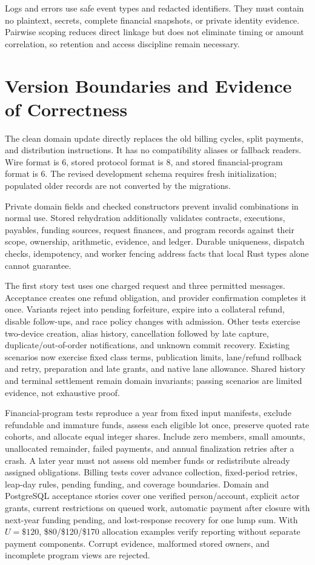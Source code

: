 \documentclass[11pt]{article}
\begin{document}
Logs and errors use safe event types and redacted identifiers. They must contain
no plaintext, secrets, complete financial snapshots, or private identity evidence.
Pairwise scoping reduces direct linkage but does not eliminate timing or amount
correlation, so retention and access discipline remain necessary.

\section{Version Boundaries and Evidence of Correctness}

The clean domain update directly replaces the old billing cycles, split payments,
and distribution instructions. It has no compatibility aliases or fallback
readers. Wire format is 6, stored protocol format is 8, and stored financial-program
format is 6. The revised development schema requires fresh initialization;
populated older records are not converted by the migrations.

Private domain fields and checked constructors prevent invalid combinations in
normal use. Stored rehydration additionally validates contracts, executions,
payables, funding sources, request finances, and program records against their
scope, ownership, arithmetic, evidence, and ledger. Durable uniqueness, dispatch
checks, idempotency, and worker fencing address facts that local Rust types alone
cannot guarantee.

The first story test uses one charged request and three permitted messages.
Acceptance creates one refund obligation, and provider confirmation completes it
once. Variants reject into pending forfeiture, expire into a collateral refund,
disable follow-ups, and race policy changes with admission. Other tests exercise
two-device creation, alias history, cancellation followed by late capture,
duplicate/out-of-order notifications, and unknown commit recovery.
Existing scenarios now exercise fixed class terms, publication limits, lane/refund
rollback and retry, preparation and late grants, and native lane allowance. Shared
history and terminal settlement remain domain invariants; passing scenarios are
limited evidence, not exhaustive proof.

Financial-program tests reproduce a year from fixed input manifests, exclude
refundable and immature funds, assess each eligible lot once, preserve quoted
rate cohorts, and allocate equal integer shares. Include zero members, small
amounts, unallocated remainder, failed payments, and
annual finalization retries after a crash. A later year must not assess old member funds
or redistribute already assigned obligations. Billing tests cover advance
collection, fixed-period retries, leap-day rules, pending funding, and coverage
boundaries. Domain and PostgreSQL acceptance stories cover one verified
person/account, explicit actor grants, current restrictions on queued work,
automatic payment after closure with next-year funding pending, and lost-response
recovery for one lump sum. With $U=\$120$, \$80/\$120/\$170 allocation
examples verify reporting without separate payment components. Corrupt evidence,
malformed stored owners, and incomplete program views are rejected.
\end{document}
